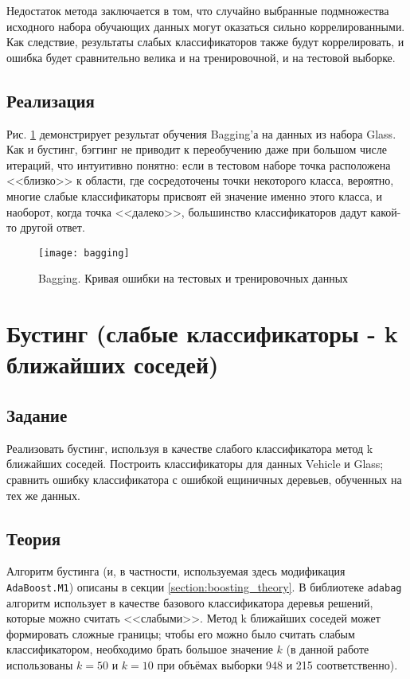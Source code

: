\documentclass[a4paper,12pt]{article} %
\newcommand{\myPictWidth}{.95\textwidth}
\begin{document}
Недостаток метода заключается в том, что случайно выбранные подмножества исходного набора обучающих данных могут оказаться сильно коррелированными. Как следствие, результаты слабых классификаторов также будут коррелировать, и ошибка будет сравнительно велика и на тренировочной, и на тестовой выборке.

\subsection{Реализация}

Рис. \ref{fig:bagging} демонстрирует результат обучения Bagging'а на данных из набора Glass.
Как и бустинг, бэггинг не приводит к переобучению даже при большом числе итераций, что интуитивно понятно: если в тестовом наборе точка расположена <<близко>> к области, где сосредоточены точки некоторого класса, вероятно, многие слабые классификаторы присвоят ей значение именно этого класса, и наоборот, когда точка <<далеко>>, большинство классификаторов дадут какой-то другой ответ.

\begin{figure}[H]
	\centering \texttt{[image: bagging]}
	\caption{Bagging. Кривая ошибки на тестовых и тренировочных данных}
	\label{fig:bagging}
\end{figure}

\newpage
\section{Бустинг (слабые классификаторы - k ближайших соседей)}
\subsection{Задание}
Реализовать бустинг, используя в качестве слабого классификатора метод k ближайших соседей. Построить классификаторы для данных Vehicle и Glass; сравнить ошибку классификатора с ошибкой ещиничных деревьев, обученных на тех же данных.

\subsection{Теория}
Алгоритм бустинга (и, в частности, используемая здесь модификация \texttt{Ada\-Boost.M1}) описаны в секции \ref{section:boosting_theory}. В библиотеке \texttt{adabag} алгоритм использует в качестве базового классификатора деревья решений, которые можно считать <<слабыми>>. Метод k ближайших соседей может формировать сложные границы; чтобы его можно было считать слабым классификатором, необходимо брать большое значение $k$ (в данной работе использованы $k=50$ и $k=10$ при объёмах выборки 948 и 215 соответственно).
\end{document}
